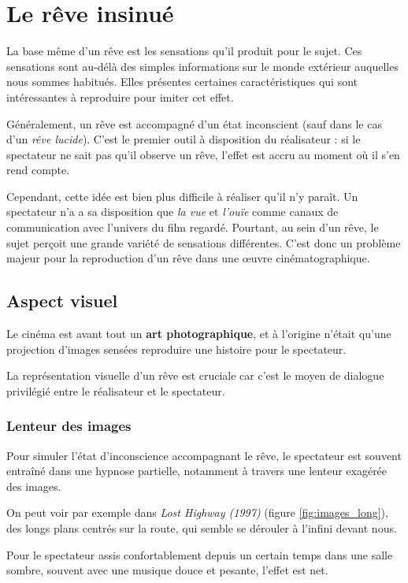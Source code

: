 \documentclass[../main.tex]{subfile}
\begin{document}
\section{Le rêve insinué}

La base même d'un rêve est les sensations qu'il produit pour le sujet. Ces
sensations sont au-délà des simples informations sur le monde extérieur
auquelles nous sommes habitués. Elles présentes certaines caractéristiques qui
sont intéressantes à reproduire pour imiter cet effet.

Généralement, un rêve est accompagné d'un état inconscient (sauf dans le cas
d'un \emph{rêve lucide}). C'est le premier outil à disposition du réalisateur :
si le spectateur ne sait pas qu'il observe un rêve, l'effet est accru au moment
où il s'en rend compte.

Cependant, cette idée est bien plus difficile à réaliser qu'il n'y paraît. Un
spectateur n'a a sa disposition que \emph{la vue} et \emph{l'ouïe} comme canaux
de communication avec l'univers du film regardé. Pourtant, au sein d'un rêve,
le sujet perçoit une grande variété de sensations différentes. C'est donc un
problème majeur pour la reproduction d'un rêve dans une \oe{}uvre
cinématographique.

\subsection{Aspect visuel}

Le cinéma est avant tout un \textbf{art photographique}, et à l'origine n'était
qu'une projection d'images sensées reproduire une histoire pour le spectateur.

La représentation visuelle d'un rêve est cruciale car c'est le moyen de
dialogue privilégié entre le réalisateur et le spectateur.

\subsubsection{Lenteur des images}

Pour simuler l'état d'inconscience accompagnant le rêve, le spectateur est
souvent entraîné dans une hypnose partielle, notamment à travers une lenteur
exagérée des images.

On peut voir par exemple dans \textit{Lost Highway (1997)} (figure
\ref{fig:images_long}), des longs plans centrés sur la route, qui semble se
dérouler à l'infini devant nous.

Pour le spectateur assis confortablement depuis un certain temps dans une salle
sombre, souvent avec une musique douce et pesante, l'effet est net.
\end{document}
